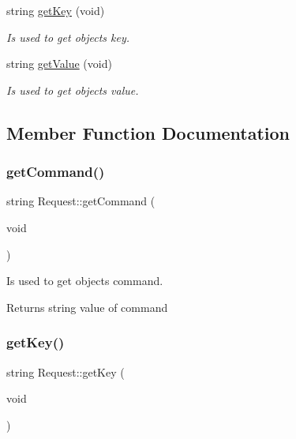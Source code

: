\begin{DoxyCompactItemize}
string \hyperlink{classRequest_aef5c14196e6a7c021f3797fc2a43473c}{get\+Key} (void)
\begin{DoxyCompactList}\small\item\em Is used to get objects\textquotesingle{} key. \end{DoxyCompactList}\item 
string \hyperlink{classRequest_adf447291d428212c0c6d93e4c72fb127}{get\+Value} (void)
\begin{DoxyCompactList}\small\item\em Is used to get objects\textquotesingle{} value. \end{DoxyCompactList}\end{DoxyCompactItemize}


\subsection{Member Function Documentation}
\mbox{\label{classRequest_a95ef26627def0c193c332b9bfd4ebf8e}} 
\subsubsection{\texorpdfstring{get\+Command()}{getCommand()}}
{\footnotesize\ttfamily string Request\+::get\+Command (\begin{DoxyParamCaption}\item[{void}]{ }\end{DoxyParamCaption})}



Is used to get objects\textquotesingle{} command. 

\begin{DoxyReturn}{Returns}
string value of command 
\end{DoxyReturn}
\mbox{\label{classRequest_aef5c14196e6a7c021f3797fc2a43473c}} 
\subsubsection{\texorpdfstring{get\+Key()}{getKey()}}
{\footnotesize\ttfamily string Request\+::get\+Key (\begin{DoxyParamCaption}\item[{void}]{ }\end{DoxyParamCaption})}




